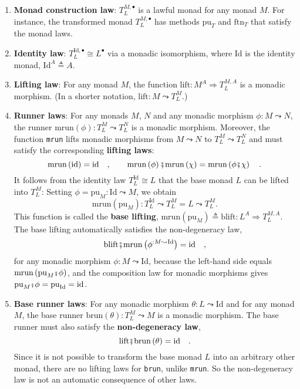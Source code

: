 \begin{enumerate}
\item \textbf{Monad construction law}: $T_{L}^{M,\bullet}$ is a lawful
monad for any monad $M$.
For instance, the transformed monad $T_{L}^{M,\bullet}$ has methods
$\text{pu}_{T}$ and $\text{ftn}_{T}$ that satisfy the monad laws.
\item \textbf{Identity law}: $T_{L}^{\text{Id},\bullet}\cong L^{\bullet}$
via a monadic isomorphism, where $\text{Id}$ is the identity monad,
$\text{Id}^{A}\triangleq A$.
\item \textbf{Lifting law}: For any
monad $M$, the function $\text{lift}:M^{A}\Rightarrow T_{L}^{M,A}$
is a monadic morphism. (In a shorter notation, $\text{lift}:M\leadsto T_{L}^{M}$.)
\item \textbf{Runner laws}: For any
monads $M$, $N$ and any monadic morphism $\phi:M\leadsto N$, the
runner $\text{mrun}\left(\phi\right):T_{L}^{M}\leadsto T_{L}^{N}$
is a monadic morphism. Moreover, the function \lstinline!mrun!
lifts monadic morphisms from $M\leadsto N$ to $T_{L}^{M}\leadsto T_{L}^{N}$
and must satisfy the corresponding \textbf{lifting laws}:
\[
\text{mrun}\left(\text{id}\right)=\text{id}\quad,\quad\quad\text{mrun}\left(\phi\right)\bef\text{mrun}\left(\chi\right)=\text{mrun}\left(\phi\bef\chi\right)\quad.
\]
It follows from the identity law $T_{L}^{\text{Id}}\cong L$ that
the base monad $L$ can be lifted into $T_{L}^{M}$: Setting $\phi=\text{pu}_{M}:\text{Id}\leadsto M$,
we obtain
\[
\text{mrun}\left(\text{pu}_{M}\right):T_{L}^{\text{Id}}\leadsto T_{L}^{M}=L\leadsto T_{L}^{M}.
\]
This function is called the \textbf{base
lifting}, $\text{mrun}\left(\text{pu}_{M}\right)\triangleq\text{blift}:L^{A}\Rightarrow T_{L}^{M,A}$.
The base lifting automatically satisfies the non-degeneracy law,
\[
\text{blift}\bef\text{mrun}\left(\phi^{:M\leadsto\text{Id}}\right)=\text{id}\quad,
\]
for any monadic morphism $\phi:M\leadsto\text{Id}$, because the left-hand
side equals $\text{mrun}\left(\text{pu}_{M}\bef\phi\right)$, and
the composition law for monadic morphisms gives $\text{pu}_{M}\bef\phi=\text{pu}_{\text{Id}}=\text{id}$.
\item \textbf{Base runner laws}:
For any monadic morphism $\theta:L\leadsto\text{Id}$ and for any
monad $M$, the base runner $\text{brun}\left(\theta\right):T_{L}^{M}\leadsto M$
is a monadic morphism. The base runner must also satisfy the \textbf{non-degeneracy
law}, 
\[
\text{lift}\bef\text{brun}\left(\theta\right)=\text{id}\quad.
\]
Since it is not possible to transform the base monad $L$ into an
arbitrary other monad, there are no lifting laws for \lstinline!brun!,
unlike \lstinline!mrun!.
So the non-degeneracy law is not an automatic consequence of other
laws.
\end{enumerate}

